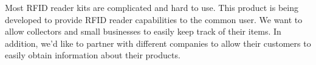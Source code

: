 Most RFID reader kits are complicated and hard to use. This product is being developed to provide RFID reader capabilities to the common user. We want to allow collectors and small businesses to easily keep track of their items. In addition, we'd like to partner with different companies to allow their customers to easily obtain information about their products.
